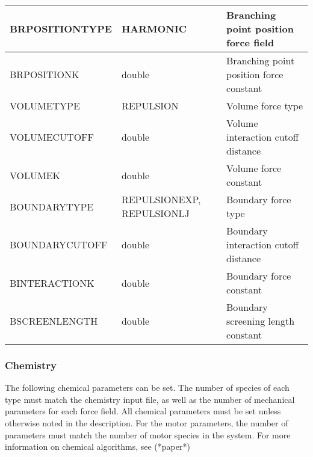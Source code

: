 \documentclass[11pt, oneside]{article}   	%
\begin{document}
\begin{longtable}{|L{4.65cm}|C{4cm}|L{4cm}|}
  \hline
   BRPOSITIONTYPE & HARMONIC & Branching point position force field \\
  \hline
   BRPOSITIONK & double & Branching point position force constant \\
  \hline
   VOLUMETYPE & REPULSION & Volume force type \\
  \hline
   VOLUMECUTOFF & double & Volume interaction cutoff distance\\
  \hline
  VOLUMEK & double & Volume force constant \\
  \hline
  BOUNDARYTYPE & REPULSIONEXP, REPULSIONLJ & Boundary force type \\
  \hline
   BOUNDARYCUTOFF & double & Boundary interaction cutoff distance\\
  \hline
  BINTERACTIONK & double & Boundary force constant \\
  \hline
  BSCREENLENGTH & double & Boundary screening length constant\\
  \hline
 
\end{longtable}

\subsubsection{Chemistry}

The following chemical parameters can be set. The number of species of each type must match the chemistry input file, as well as the number of mechanical parameters for each force field. All chemical parameters must be set unless otherwise noted in the description. For the motor parameters, the number of parameters must match the number of motor species in the system. For more information on chemical algorithms, see (*paper*)
\end{document}
